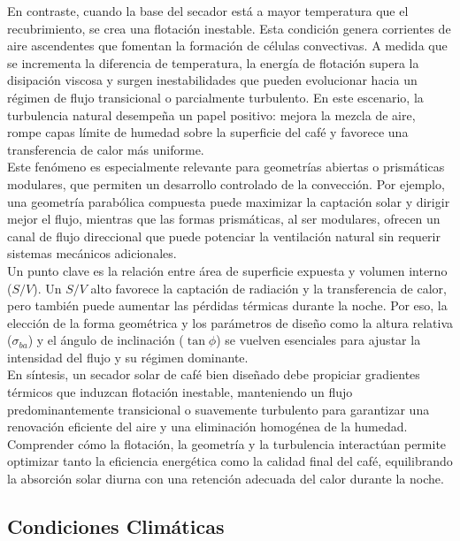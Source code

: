 \documentclass[12pt]{article}
\begin{document}
En contraste, cuando la base del secador está a mayor temperatura que el recubrimiento, se crea una flotación inestable. Esta condición genera corrientes de aire ascendentes que fomentan la formación de células convectivas. A medida que se incrementa la diferencia de temperatura, la energía de flotación supera la disipación viscosa y surgen inestabilidades que pueden evolucionar hacia un régimen de flujo transicional o parcialmente turbulento. En este escenario, la turbulencia natural desempeña un papel positivo: mejora la mezcla de aire, rompe capas límite de humedad sobre la superficie del café y favorece una transferencia de calor más uniforme. \\

Este fenómeno es especialmente relevante para geometrías abiertas o prismáticas modulares, que permiten un desarrollo controlado de la convección. Por ejemplo, una geometría parabólica compuesta puede maximizar la captación solar y dirigir mejor el flujo, mientras que las formas prismáticas, al ser modulares, ofrecen un canal de flujo direccional que puede potenciar la ventilación natural sin requerir sistemas mecánicos adicionales.\\

Un punto clave es la relación entre área de superficie expuesta y volumen interno ($S/V$). Un $S/V$ alto favorece la captación de radiación y la transferencia de calor, pero también puede aumentar las pérdidas térmicas durante la noche. Por eso, la elección de la forma geométrica y los parámetros de diseño como la altura relativa ($\sigma_{ba}$) y el ángulo de inclinación ($\tan\phi$) se vuelven esenciales para ajustar la intensidad del flujo y su régimen dominante.\\

En síntesis, un secador solar de café bien diseñado debe propiciar gradientes térmicos que induzcan flotación inestable, manteniendo un flujo predominantemente transicional o suavemente turbulento para garantizar una renovación eficiente del aire y una eliminación homogénea de la humedad. Comprender cómo la flotación, la geometría y la turbulencia interactúan permite optimizar tanto la eficiencia energética como la calidad final del café, equilibrando la absorción solar diurna con una retención adecuada del calor durante la noche.



\subsection{Condiciones Climáticas}
\end{document}
